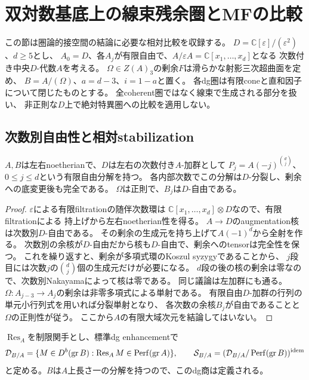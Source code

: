 \section{双対数基底上の線束残余圏とMFの比較}
\label{fdw:sec:window}

この節は圏論的接空間の結論に必要な相対比較を収録する。
$D=\mathbb C[\varepsilon]/(\varepsilon^2)$、$d\ge5$とし、
$A_0=D$、各$A_j$が有限自由で、$A/\varepsilon A=\mathbb C[x_1,\ldots,x_d]$となる
次数付き中央$D$-代数$A$を考える。
$\Omega\in Z(A)_3$の剰余$F$は滑らかな射影三次超曲面を定め、
$B=A/(\Omega)$、$a=d-3$、$i=1-a$と置く。
各dg圏は有限coneと直和因子について閉じたものとする。
全coherent圏ではなく線束で生成される部分を扱い、
非正則な$D$上で絶対特異圏への比較を適用しない。

\subsection{次数別自由性と相対stabilization}

\begin{lemma}[相対Koszul分解と中心商]\label{fdw:lem:resolution}
$A,B$は左右noetherianで、$D$は左右の次数付き$A$-加群として
$P_j=A(-j)^{\binom dj}$、$0\le j\le d$という有限自由分解を持つ。
各内部次数でこの分解は$D$-分裂し、剰余への底変更後も完全である。
$\Omega$は正則で、$B_j$は$D$-自由である。
\end{lemma}
\begin{proof}
$\varepsilon$による有限filtrationの随伴次数環は
$\mathbb C[x_1,\ldots,x_d]\otimes D$なので、有限filtrationによる
持上げから左右noetherian性を得る。
$A\to D$のaugmentation核は次数別$D$-自由である。
その剰余の生成元を持ち上げて$A(-1)^d$から全射を作る。
次数別の余核が$D$-自由だから核も$D$-自由で、剰余へのtensorは完全性を保つ。
これを繰り返すと、剰余が多項式環のKoszul syzygyであることから、
$j$段目には次数$j$の$\binom dj$個の生成元だけが必要になる。
$d$段の後の核の剰余は零なので、次数別Nakayamaによって核は零である。
同じ議論は左加群にも通る。
$\Omega:A_{j-3}\to A_j$の剰余は非零多項式による単射である。
有限自由$D$-加群の行列の単元小行列式を用いれば分裂単射となり、
各次数の余核$B_j$が自由であることと$\Omega$の正則性が従う。
ここから$A$の有限大域次元を結論してはいない。
\end{proof}

$\operatorname{Res}_A$を制限関手とし、標準dg enhancementで
\[
 \mathcal D_{B/A}=
 \{M\in D^b(\operatorname{gr}B):\operatorname{Res}_AM\in\operatorname{Perf}(\operatorname{gr}A)\},
 \qquad
 \mathcal S_{B/A}=(\mathcal D_{B/A}/\operatorname{Perf}(\operatorname{gr}B))^{\rm idem}
\]
と定める。$B$は$A$上長さ一の分解を持つので、このdg商は定義される。

